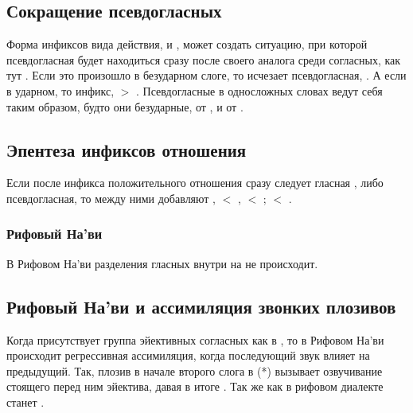\subsection{Сокращение псевдо\-гласных} 
 Форма инфиксов вида действия, 
и , может создать ситуацию, при которой псевдогласная будет находиться сразу после своего аналога среди согласных, как тут .  Если это произошло в безударном слоге, то исчезает псевдогласная, .  А если в ударном, то инфикс,  $>$
.  Псевдогласные в односложных словах ведут себя таким образом, будто они безударные,  от , и 
от .

\subsection{Эпентеза инфиксов отношения} Если после инфикса положительного от\-но\-ше\-ния  сразу следует гласная ,  либо псевдогласная, то между ними добавляют 
,  $<$ ,  $<$
;  $<$ .
\label{l-and-s:eiy-epenth}

\subsubsection{Рифовый На'ви} 
В Рифовом На'ви разделения гласных внутри  на  не происходит.


\subsection{Рифовый На'ви и ассимиляция звонких плозивов} 
Когда присутствует группа эйективных согласных как в  , то в Рифовом На'ви происходит регрессивная ассимиляция, когда последующий звук влияет на предыдущий.
Так, плозив в начале второго слога в (*) вызывает озвучивание стоящего перед ним эйектива, давая в итоге .
Так же как   в рифовом диалекте станет .

